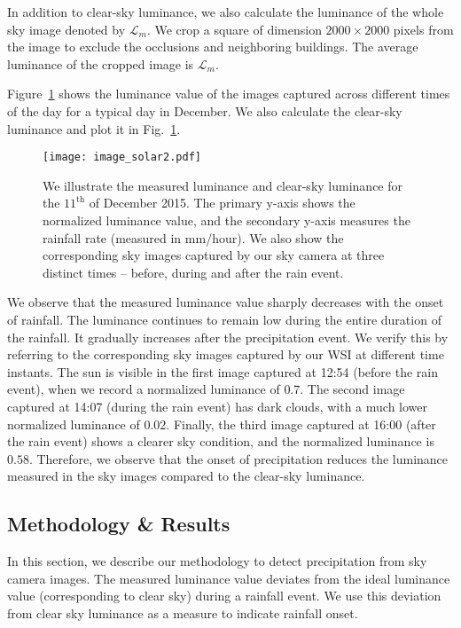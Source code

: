 In addition to clear-sky luminance, we also calculate the luminance of the whole sky image denoted by $\mathcal{L}_m$. We crop a square of dimension $2000 \times 2000$ pixels from the image to exclude the occlusions and neighboring buildings. The average luminance of the cropped image is $\mathcal{L}_m$.

Figure~\ref{fig:example} shows the luminance value of the images captured across different times of the day for a typical day in December. We also calculate the clear-sky luminance and plot it in Fig.~\ref{fig:example}.

\begin{figure}[htb]
\centering
\texttt{[image: image\_solar2.pdf]}
\caption[Effect of the onset of rainfall on the measured luminance from sky camera.]{We illustrate the measured luminance and clear-sky luminance for the $11^\mathrm{th}$ of December 2015. The primary y-axis shows the normalized luminance value, and the secondary y-axis measures the rainfall rate (measured in mm/hour). We also show the corresponding sky images captured by our sky camera at three distinct times -- before, during and after the rain event.} 
\label{fig:example}
\end{figure} 

We observe that the measured luminance value sharply decreases with the onset of rainfall. The luminance continues to remain low during the entire duration of the rainfall. It gradually increases after the precipitation event. We verify this by referring to the corresponding sky images captured by our WSI at different time instants. The sun is visible in the first image captured at 12:54 (before the rain event), when we record a normalized luminance of $0.7$. The second image captured at 14:07 (during the rain event) has dark clouds, with a much lower normalized luminance of $0.02$. Finally, the third image captured at 16:00 (after the rain event) shows a clearer sky condition, and the normalized luminance is $0.58$. Therefore, we observe that the onset of precipitation reduces the luminance measured in the sky images compared to the clear-sky luminance. 

\subsection{Methodology \& Results}
In this section, we describe our methodology to detect precipitation from sky camera images. The measured luminance value deviates from the ideal luminance value (corresponding to clear sky) during a rainfall event. We use this deviation from clear sky luminance as a measure to indicate rainfall onset.


